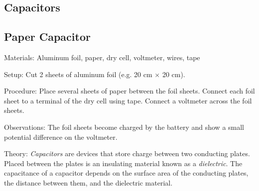 \begin{multicols}{2}
\columnbreak


\section*{Capacitors}

\subsection{Paper Capacitor}


\begin{description*}
\item[Materials:]{Aluminum foil, paper, dry cell, voltmeter, wires, tape}
\item[Setup:]{Cut 2 sheets of aluminum foil (e.g. 20 cm $\times$ 20 cm).}
\item[Procedure:]{Place several sheets of paper between the foil sheets. Connect each foil sheet to a terminal of the dry cell using tape. Connect a voltmeter across the foil sheets.}
\item[Observations:]{The foil sheets become charged by the battery and show a small potential difference on the voltmeter.}
\item[Theory:]{\emph{Capacitors} are devices that store charge between two conducting plates. Placed between the plates is an insulating material known as a \emph{dielectric}. The capacitance of a capacitor depends on the surface area of the conducting plates, the distance between them, and the dielectric material.}
\end{description*}


\end{multicols}

\pagebreak